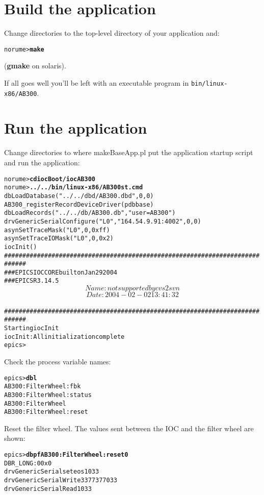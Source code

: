 \documentclass[twoside]{article}
\begin{document}
\section{Build the application}
Change directories to the top-level directory of your application and:
\begin{alltt}
norume> {\bf make}
\end{alltt}
({\bf gmake} on solaris).

If all goes well you'll be left with an executable program in
{\tt bin/linux-x86/AB300}.



\section{Run the application}
Change directories to where makeBaseApp.pl put the application startup script
and run the application:
\begin{alltt}
norume> {\bf cd iocBoot/iocAB300}
norume> {\bf ../../bin/linux-x86/AB300 st.cmd}
dbLoadDatabase("../../dbd/AB300.dbd",0,0)
AB300_registerRecordDeviceDriver(pdbbase) 
dbLoadRecords("../../db/AB300.db","user=AB300")
drvGenericSerialConfigure("L0","164.54.9.91:4002",0,0)
asynSetTraceMask("L0",0,0xff)
asynSetTraceIOMask("L0",0,0x2)
iocInit()
############################################################################
###  EPICS IOC CORE built on Jan 29 2004
###  EPICS R3.14.5 $$Name: not supported by cvs2svn $$ $$Date: 2004-02-02 13:41:32 $$
############################################################################
Starting iocInit
iocInit: All initialization complete
epics>
\end{alltt}

Check the process variable names:
\begin{alltt}
epics> {\bf dbl}
AB300:FilterWheel:fbk
AB300:FilterWheel:status
AB300:FilterWheel
AB300:FilterWheel:reset
\end{alltt}

Reset the filter wheel.  The values sent between the IOC and the filter wheel
are shown:
\begin{alltt}
epics> {\bf dbpf AB300:FilterWheel:reset 0}
DBR_LONG:           0         0x0                 
drvGenericSerial set eos 1 \verb@\@033
drvGenericSerialWrite 3 \verb@\@377\verb@\@377\verb@\@033
drvGenericSerialRead 1 \verb@\@033
\end{alltt}
\end{document}
